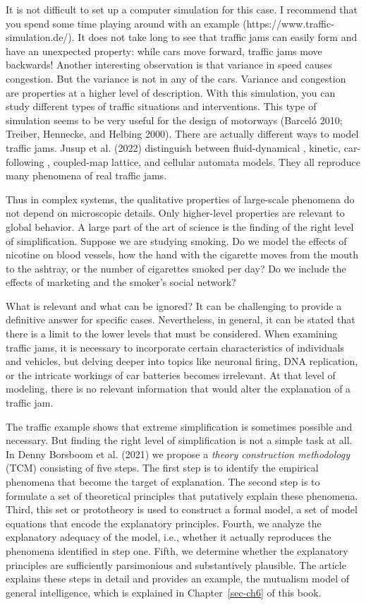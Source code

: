 \documentclass[
  a4paper,
  DIV=11,
  numbers=noendperiod,
  oneside]{scrreprt}
\begin{document}
It is not difficult to set up a computer simulation for this case. I
recommend that you spend some time playing around with an example
(https://www.traffic-simulation.de/). It does not take long to see that
traffic jams can easily form and have an unexpected property: while cars
move forward, traffic jams move backwards! Another interesting
observation is that variance in speed causes congestion. But the
variance is not in any of the cars. Variance and congestion are
properties at a higher level of description. With this simulation, you
can study different types of traffic situations and interventions. This
type of simulation seems to be very useful for the design of motorways
(Barceló 2010; Treiber, Hennecke, and Helbing 2000). There are actually
different ways to model traffic jams. Jusup et al. (2022) distinguish
between fluid-dynamical , kinetic, car-following , coupled-map lattice,
and cellular automata models. They all reproduce many phenomena of real
traffic jams.

Thus in complex systems, the qualitative properties of large-scale
phenomena do not depend on microscopic details. Only higher-level
properties are relevant to global behavior. A large part of the art of
science is the finding of the right level of simplification. Suppose we
are studying smoking. Do we model the effects of nicotine on blood
vessels, how the hand with the cigarette moves from the mouth to the
ashtray, or the number of cigarettes smoked per day? Do we include the
effects of marketing and the smoker's social network?

What is relevant and what can be ignored? It can be challenging to
provide a definitive answer for specific cases. Nevertheless, in
general, it can be stated that there is a limit to the lower levels that
must be considered. When examining traffic jams, it is necessary to
incorporate certain characteristics of individuals and vehicles, but
delving deeper into topics like neuronal firing, DNA replication, or the
intricate workings of car batteries becomes irrelevant. At that level of
modeling, there is no relevant information that would alter the
explanation of a traffic jam.

The traffic example shows that extreme simplification is sometimes
possible and necessary. But finding the right level of simplification is
not a simple task at all. In Denny Borsboom et al. (2021) we propose a
\emph{theory construction methodology} (TCM) consisting of five steps.
The first step is to identify the empirical phenomena that become the
target of explanation. The second step is to formulate a set of
theoretical principles that putatively explain these phenomena. Third,
this set or prototheory is used to construct a formal model, a set of
model equations that encode the explanatory principles. Fourth, we
analyze the explanatory adequacy of the model, i.e., whether it actually
reproduces the phenomena identified in step one. Fifth, we determine
whether the explanatory principles are sufficiently parsimonious and
substantively plausible. The article explains these steps in detail and
provides an example, the mutualism model of general intelligence, which
is explained in Chapter~\ref{sec-ch6} of this book.
\end{document}
